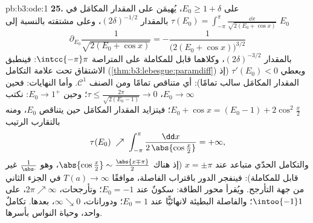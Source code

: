 \begin{solution}{pb:b3:ode:1}
\textbf{25.} على $E_0 \geq 1 + \delta$، يُهيمَن على المقدار المكامَل في
$\tau(E_0) = \int_{-\pi}^{\pi}\frac{\dd x}{\sqrt{2(E_0 +
\cos x)}}$ بالمقدار $(2\delta)^{-1/2}$، وعلى مشتقته بالنسبة إلى $E_0$
\[
\partial_{E_0}\frac1{\sqrt{2(E_0 + \cos x)}}
= -\frac{1}{\bigl(2(E_0 + \cos x)\bigr)^{3/2}}
\]
بالمقدار $(2\delta)^{-3/2}$، وكلاهما قابل للمكاملة على المتراصة $\intcc{-\pi}\pi$:
فينطبق الاشتقاق تحت علامة التكامل (\cref{thm:b3:lebesgue:paramdiff}) ويعطي
$\tau'(E_0) < 0$ (إذ المقدار المكامَل سالب تمامًا): أي متناقص
تمامًا ومن الصنف $\mathcal C^1$. وأما النهايات: فحين $E_0 \to
\infty$،
$\tau \leq \frac{2\pi}{\sqrt{2(E_0 - 1)}} \to 0$؛ وحين $E_0 \to 1^+$: نكتب $E_0 + \cos x = (E_0 - 1) +
2\cos^2\frac x2$؛ فيتزايد المقدار
المكامَل حين يتناقص $E_0$، ومنه بالتقارب الرتيب
\[
\tau(E_0) \;\nearrow\;
\int_{-\pi}^{\pi}\frac{\dd x}{2\,\abs{\cos\frac x2}}
= +\infty,
\]
والتكامل الحدّي متباعد عند $x = \pm\pi$ (إذ هناك $\abs{\cos\frac x2} \sim \frac{\abs{x \mp \pi}}2$، وهو
$\frac1{\abs\cdot}$ غير قابل للمكاملة): فينفجر الدور باقتراب الفاصلة،
موافقًا $T(a) \to
\infty$ في الجزء الثاني من جهة التأرجح. ويُقرأ محور
الطاقة: سكونٌ عند $E_0 = -1$؛ وتأرجحات، $2\pi \nearrow
\infty$، على
$\intoo{-1}1$؛ والفاصلة البطيئة لانهائيًّا عند $E_0 = 1$؛
ودورانات، $\infty \searrow 0$، بعدها. تكاملٌ واحد، وحياة النواس بأسرها.
\end{solution}
